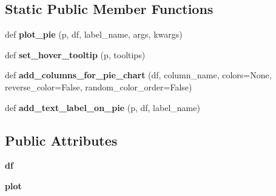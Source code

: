 \subsection*{Static Public Member Functions}
\begin{DoxyCompactItemize}
\item 
\mbox{\label{classboksplots_1_1custompie_1_1CustomPieBuilder_a25375d661ddd2b0655458b9daaf902d0}} 
def {\bfseries plot\+\_\+pie} (p, df, label\+\_\+name, args, kwargs)
\item 
\mbox{\label{classboksplots_1_1custompie_1_1CustomPieBuilder_afb446c5ffd55520cf7960ba68b7e3908}} 
def {\bfseries set\+\_\+hover\+\_\+tooltip} (p, tooltips)
\item 
\mbox{\label{classboksplots_1_1custompie_1_1CustomPieBuilder_acad5c9277f13865d5c9977222170d324}} 
def {\bfseries add\+\_\+columns\+\_\+for\+\_\+pie\+\_\+chart} (df, column\+\_\+name, colors=None, reverse\+\_\+color=False, random\+\_\+color\+\_\+order=False)
\item 
\mbox{\label{classboksplots_1_1custompie_1_1CustomPieBuilder_a082c532d3af7e45ce0e02b7ea0d5ebf1}} 
def {\bfseries add\+\_\+text\+\_\+label\+\_\+on\+\_\+pie} (p, df, label\+\_\+name)
\end{DoxyCompactItemize}
\subsection*{Public Attributes}
\begin{DoxyCompactItemize}
\item 
\mbox{\label{classboksplots_1_1custompie_1_1CustomPieBuilder_a4652a3a8ade80e70fe3716ca30e106a3}} 
{\bfseries df}
\item 
\mbox{\label{classboksplots_1_1custompie_1_1CustomPieBuilder_a57d349e435b1dd5774c8eed0fae58eaa}} 
{\bfseries plot}
\end{DoxyCompactItemize}
